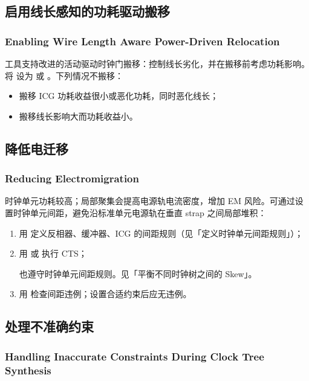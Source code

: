 \subsection{启用线长感知的功耗驱动搬移}
\subsubsection*{Enabling Wire Length Aware Power-Driven Relocation}

工具支持改进的活动驱动时钟门搬移：控制线长劣化，并在搬移前考虑功耗影响。将  设为  或 。下列情况不搬移：
\begin{itemize}
  \item 搬移 ICG 功耗收益很小或恶化功耗，同时恶化线长；
  \item 搬移线长影响大而功耗收益小。
\end{itemize}

\subsection{降低电迁移}
\subsubsection*{Reducing Electromigration}

时钟单元功耗较高；局部聚集会提高电源轨电流密度，增加 EM 风险。可通过设置时钟单元间距，避免沿标准单元电源轨在垂直 strap 之间局部堆积：
\begin{enumerate}
  \item 用  定义反相器、缓冲器、ICG 的间距规则（见「定义时钟单元间距规则」）；
  \item 用  或  执行 CTS；
\begin{noteBox}
 也遵守时钟单元间距规则。见「平衡不同时钟树之间的 Skew」。
\end{noteBox}
  \item 用  检查间距违例；设置合适约束后应无违例。
\end{enumerate}

\subsection{处理不准确约束}
\subsubsection*{Handling Inaccurate Constraints During Clock Tree Synthesis}

